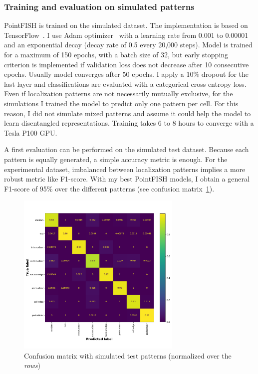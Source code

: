 \subsubsection{Training and evaluation on simulated patterns}

PointFISH is trained on the simulated dataset.
The implementation is based on TensorFlow~\cite{tensorflow_2015}.
I use Adam optimizer~\cite{Diederik_2015} with a learning rate from 0.001 to 0.00001 and an exponential decay (decay rate of 0.5 every 20,000 steps).
Model is trained for a maximum of 150 epochs, with a batch size of 32, but early stopping criterion is implemented if validation loss does not decrease after 10 consecutive epochs.
Usually model converges after 50 epochs.
I apply a 10\% dropout for the last layer and classifications are evaluated with a categorical cross entropy loss.
Even if localization patterns are not necessarily mutually exclusive, for the simulations I trained the model to predict only one pattern per cell.
For this reason, I did not simulate mixed patterns and assume it could help the model to learn disentangled representations.
Training takes 6 to 8 hours to converge with a Tesla P100 GPU.

A first evaluation can be performed on the simulated test dataset.
Because each pattern is equally generated, a simple accuracy metric is enough.
For the experimental dataset, imbalanced between localization patterns implies a more robust metric like F1-score.
With my best PointFISH models, I obtain a general F1-score of 95\% over the different patterns (see confusion matrix~\ref{fig:confusion_matrix}).

\begin{figure}[]
    \centering
    \includegraphics[width=0.7\textwidth]{figures/chapter4/confusion_matrix}
    \caption[Confusion matrix with simulated test set]{Confusion matrix with simulated test patterns (normalized over the \textit{rows})}
    \label{fig:confusion_matrix}
\end{figure}

